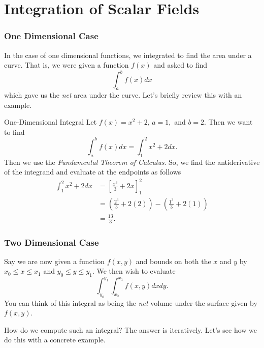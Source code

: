         \section{Integration of Scalar Fields}
        
        \subsubsection{One Dimensional Case}
        In the case of one dimensional functions, we integrated to find the area under a curve.  That is, we were given a function $f(x)$ and asked to find
        \[
        \int_a^b f(x)dx
        \]
        which gave us the \emph{net} area under the curve.  Let's briefly review this with an example.
        
        \begin{ex}{One-Dimensional Integral}
        Let $f(x) = x^2+2$, $a=1,$ and $b=2$. Then we want to find
        \[
        \int_a^b f(x)dx = \int_1^2 x^2+2dx.
        \]
        Then we use the \emph{Fundamental Theorem of Calculus}. So, we find the antiderivative of the integrand and evaluate at the endpoints as follows
        \begin{align*}
            \int_1^2 x^2+2dx &= \left[ \frac{x^3}{3}+2x\right]_1^2\\
            &= \left(\frac{2^3}{3}+2(2)\right) - \left( \frac{1^3}{3}+2(1)\right)\\
            &= \frac{13}{3}.
        \end{align*}
        \end{ex}
        
        \subsubsection{Two Dimensional Case}
        
        Say we are now given a function $f(x,y)$ and bounds on both the $x$ and $y$ by
        $x_0 \leq x \leq x_1$ and $y_0 \leq y \leq y_1$.  We then wish to evaluate
        \[
        \int_{y_0}^{y_1} \int_{x_0}^{x_1} f(x,y)dxdy.
        \]
        You can think of this integral as being the \emph{net} volume under the surface given by $f(x,y)$.  
        
        How do we compute such an integral? The answer is iteratively.  Let's see how we do this with a concrete example.
        
